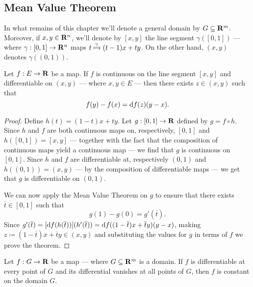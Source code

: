 \subsection{Mean Value Theorem}

\begin{remark}
    In what remains of this chapter we'll denote a general domain by \(G \subseteq
    \mathbf{R}^m\). Moreover, if \(x, y \in \mathbf{R}^n\), we'll denote by \([x, y]\) the line
    segment \(\gamma([0, 1])\) --- where \(\gamma: [0, 1] \to \mathbf{R}^n\) maps \(t
    \xmapsto \gamma (t - 1) x + t y\). On the other hand, \((x, y)\) denotes
    \(\gamma((0, 1))\).
\end{remark}

\begin{theorem}
    \label{thm: several-mvt-real-val}
    Let \(f: E \to \mathbf{R}\) be a map. If \(f\) is continuous on the line segment \([x,
            y]\) and differentiable on \((x, y)\) --- where \(x, y \in E\) --- then there
    exists \(z \in (x, y)\) such that
    \[
        f(y) - f(x) = \mathrm{d} f(z)(y - x).
    \]
\end{theorem}

\begin{proof}
    Define \(h(t) = (1 - t) x + ty\). Let \(g: [0, 1] \to \mathbf{R}\) defined by \(g = f
    \circ h\). Since \(h\) and \(f\) are both continuous maps on, respectively,
    \([0, 1]\) and \(h([0, 1]) = [x, y]\) --- together with the fact that the
    composition of continuous maps yield a continuous map --- we find that \(g\)
    is continuous on \([0, 1]\). Since \(h\) and \(f\) are differentiable at,
    respectively \((0, 1)\) and \(h((0, 1)) = (x, y)\) --- by the composition of
    differentiable maps --- we get that \(g\) is differentiable on \((0, 1)\).

    We can now apply the Mean Value Theorem on \(g\) to ensure that there exists
    \(\overline t \in [0, 1]\) such that
    \[
        g(1) - g(0) = g'(\overline t).
    \]
    Since \(g'(\overline t) = [\mathrm{d} f(h(\overline t))](h'(\overline t)) = \mathrm{d}
    f((1 -\overline t) x + \overline t y)(y - x)\), making \(z \coloneq (1 - \overline
    t)x + \overline t y \in (x, y)\) and substituting the values for \(g\) in
    terms of \(f\) we prove the theorem.
\end{proof}

\begin{corollary}\label{cor: sev-const}
    Let \(f: G \to \mathbf{R}\) be a map --- where \(G \subseteq \mathbf{R}^m\) is a domain. If
    \(f\) is differentiable at every point of \(G\) and its differential vanishes
    at all points of \(G\), then \(f\) is constant on the domain \(G\).
\end{corollary}

